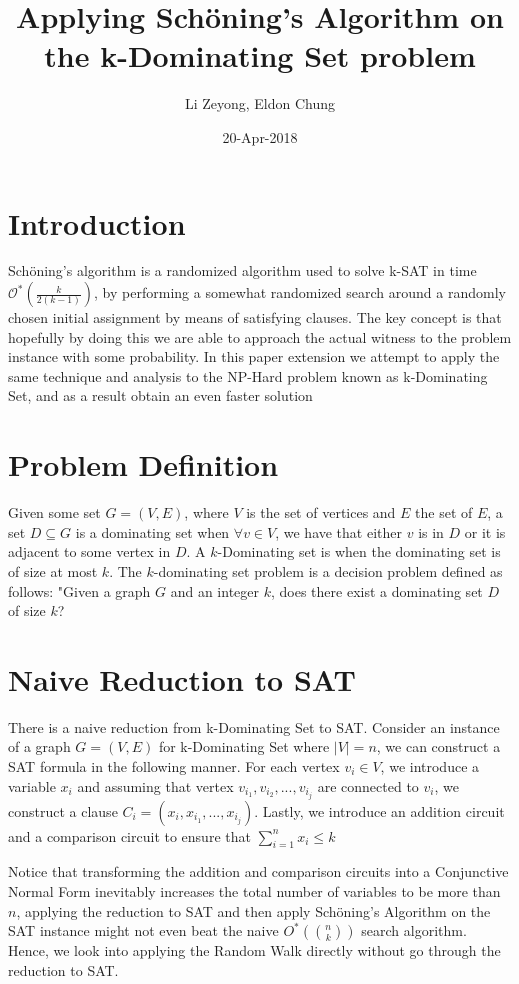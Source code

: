 \documentclass{article}
\title{Applying Sch\"{o}ning's Algorithm on the k-Dominating Set problem}
\author{Li Zeyong, Eldon Chung}
\date{20-Apr-2018}
\begin{document}
\maketitle

\section{Introduction}
	Sch\"{o}ning's algorithm is a randomized algorithm used to solve k-SAT in time $\mathcal{O}^*(\frac{k}{2(k-1)})$, by performing a somewhat randomized search around a randomly chosen initial assignment by means of satisfying clauses. The key concept is that hopefully by doing this we are able to approach the actual witness to the problem instance with some probability. In this paper extension we attempt to apply the same technique and analysis to the NP-Hard problem known as k-Dominating Set, and as a result obtain an even faster solution \par 
	
\section{Problem Definition}
	Given some set $G = (V, E)$, where $V$ is the set of vertices and $E$ the set of $E$, a set $D \subseteq G$ is a dominating set when $\forall v \in V$, we have that either $v$ is in $D$ or it is adjacent to some vertex in $D$. A $k$-Dominating set is when the dominating set is of size at most $k$. The $k$-dominating set problem is a decision problem defined as follows: "Given a graph $G$ and an integer $k$, does there exist a dominating set $D$ of size $k$?\par

\section{Naive Reduction to SAT}
There is a naive reduction from k-Dominating Set to SAT. Consider an instance of a graph $G = (V,E)$ for k-Dominating Set where $|V| = n$, we can construct a SAT formula in the following manner. For each vertex $v_i \in V$, we introduce a variable $x_i$ and assuming that vertex $v_{i_1}, v_{i_2},..., v_{i_j}$ are connected to $v_i$, we construct a clause $C_i = (x_i, x_{i_1}, ..., x_{i_j})$. Lastly, we introduce an addition circuit and a comparison circuit to ensure that $\sum_{i = 1}^n x_i 
\leq k$ \par
Notice that transforming the addition and comparison circuits into a Conjunctive Normal Form inevitably increases the total number of variables to be more than $n$, applying the reduction to SAT and then apply Sch\"{o}ning's Algorithm on the SAT instance might not even beat the naive $O^*({n \choose k})$ search algorithm. Hence, we look into applying the Random Walk directly without go through the reduction to SAT.
\end{document}
